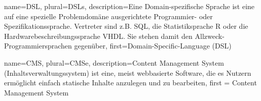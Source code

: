  {
  name={DSL},
  plural={DSLs},
  description={Eine Domain-spezifische Sprache ist eine auf eine spezielle Problemdomäne ausgerichtete Programmier- oder Spezifikationssprache. Vertreter sind z.B. SQL, die Statistiksprache R oder die Hardwarebeschreibungssprache VHDL. Sie stehen damit den Allzweck-Programmiersprachen gegenüber},
  first={Domain-Specific-Language (DSL)}
}


 {
  name={CMS},
  plural={CMSe},
  description={Content Management System (Inhaltsverwaltungssystem) ist eine, meist webbasierte Software, die es Nutzern ermöglicht einfach statische Inhalte anzulegen und zu bearbeiten},
first = {Content Management System}
}
\newcommand{\glossar}[1]{$^\uparrow$\gls{#1}}

\newcommand{\glossarpl}[1]{$^\uparrow$\glspl{#1}}
\glsaddall

\renewcommand{\glossarypreamble}{Im Folgenden werden einige oft verwendete Begriffe näher erläutert. Innerhalb des Hauptteils dieser Arbeit sind diese Begriffe mit einem $^\uparrow$ gekennzeichnet.}

\printglossary[toctitle=Glossar]

